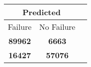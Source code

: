 \begin{tabular} 
 {@{}ccc@{}} 
\toprule 
\multicolumn{2}{c}{\textbf{Predicted}}
 \\ \midrule 
\multicolumn{1}{|c|}{Failure} & 
\multicolumn{1}{c|}{No Failure}
 \\ \midrule 
\multicolumn{1}{|c|}{\color{green}\textbf{89962}} & 
\multicolumn{1}{c|}{\color{red}\textbf{6663}}
 \\ \midrule 
\multicolumn{1}{|c|}{\color{red}\textbf{16427}} & 
\multicolumn{1}{c|}{\color{green}\textbf{57076}}
 \\ \bottomrule 
\end{tabular} 
